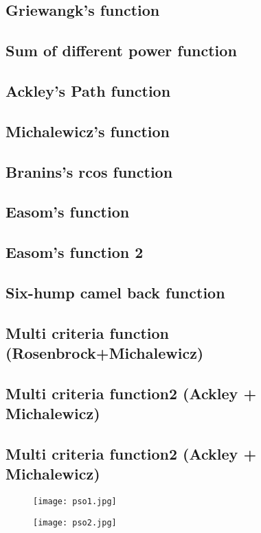 \documentclass[a4paper,11pt,twocolumn]{article}
\begin{document}
\subsection{Griewangk's function}
\subsection{Sum of different power function}
\subsection{Ackley's Path function}
\subsection{Michalewicz's function}
\subsection{Branins's rcos function}
\subsection{Easom's function}
\subsection{Easom's function 2}
\subsection{Six-hump camel back function}
\subsection{Multi criteria function (Rosenbrock+Michalewicz)}
\subsection{Multi criteria function2 (Ackley + Michalewicz)}

\subsection{Multi criteria function2 (Ackley + Michalewicz)}

\begin{figure}[h]
   \centering
	\texttt{[image: pso1.jpg]}
\end{figure}

\begin{figure}[h]
   \centering
	\texttt{[image: pso2.jpg]}
\end{figure}
\end{document}
